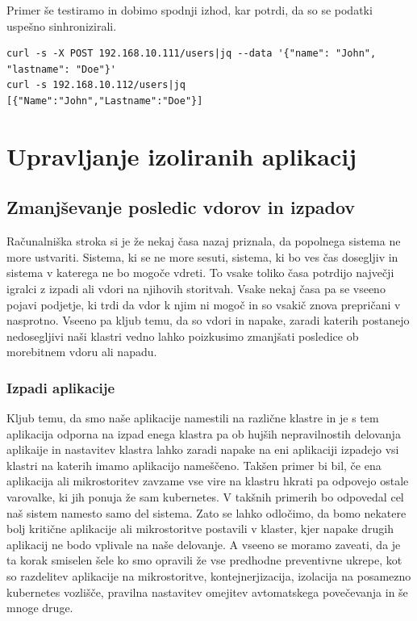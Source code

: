 \documentclass[a4paper, 12pt]{book}
\begin{document}
Primer še testiramo in dobimo spodnji izhod, kar potrdi, da so se podatki uspešno sinhronizirali.
\begin{verbatim}
curl -s -X POST 192.168.10.111/users|jq --data '{"name": "John", "lastname": "Doe"}'
curl -s 192.168.10.112/users|jq
[{"Name":"John","Lastname":"Doe"}]
\end{verbatim}



\chapter{Upravljanje izoliranih aplikacij}
\section{Zmanjševanje posledic vdorov in izpadov}
Računalniška stroka si je že nekaj časa nazaj priznala, da popolnega sistema ne more ustvariti.
Sistema, ki se ne more sesuti, sistema, ki bo ves čas dosegljiv in sistema v katerega ne bo mogoče vdreti.
To vsake toliko časa potrdijo največji igralci z izpadi ali vdori na njihovih storitvah. 
Vsake nekaj časa pa se vseeno pojavi podjetje, ki trdi da vdor k njim ni mogoč in so vsakič znova prepričani v nasprotno.
Vseeno pa kljub temu, da so vdori in napake, zaradi katerih postanejo nedosegljivi naši klastri vedno lahko poizkusimo zmanjšati posledice ob morebitnem vdoru ali napadu. 
\subsection{Izpadi aplikacije}
Kljub temu, da smo naše aplikacije namestili na različne klastre in je s tem aplikacija odporna na izpad enega klastra pa ob hujših nepravilnostih delovanja aplikaije in nastavitev klastra lahko zaradi napake na eni aplikaciji izpadejo vsi klastri na katerih imamo aplikacijo nameščeno.
Takšen primer bi bil, če ena aplikacija ali mikrostoritev zavzame vse vire na klastru hkrati pa odpovejo ostale varovalke, ki jih ponuja že sam kubernetes.
V takšnih primerih bo odpovedal cel naš sistem namesto samo del sistema.
Zato se lahko odločimo, da bomo nekatere bolj kritične aplikacije ali mikrostoritve postavili v klaster, kjer napake drugih aplikacij ne bodo vplivale na naše delovanje.
A vseeno se moramo zaveati, da je ta korak smiselen šele ko smo opravili že vse predhodne preventivne ukrepe, kot so razdelitev aplikacije na mikrostoritve, kontejnerjizacija, izolacija na posamezno kubernetes vozlišče, pravilna nastavitev omejitev avtomatskega povečevanja in še mnoge druge.
\end{document}
